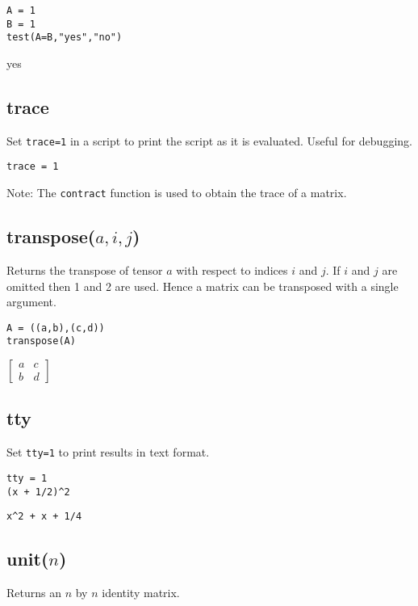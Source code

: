 {\color{blue}
\begin{verbatim}
A = 1
B = 1
test(A=B,"yes","no")
\end{verbatim}
}

\noindent
yes

\subsection*{trace}

Set {\tt trace=1} in a script to print the script as it is evaluated.
Useful for debugging.

{\color{blue}
\begin{verbatim}
trace = 1
\end{verbatim}
}

\noindent
Note:
The
\verb$contract$
function is used to obtain the trace of a matrix.

\subsection*{transpose($a,i,j$)}

Returns the transpose of tensor $a$ with respect to indices $i$ and $j$.
If $i$ and $j$ are omitted then 1 and 2 are used.
Hence a matrix can be transposed with a single argument.

{\color{blue}
\begin{verbatim}
A = ((a,b),(c,d))
transpose(A)
\end{verbatim}
}

\noindent
$\displaystyle
\begin{bmatrix}
a & c\\
b & d
\end{bmatrix}
$

\subsection*{tty}

Set {\tt tty=1} to print results in text format.

{\color{blue}
\begin{verbatim}
tty = 1
(x + 1/2)^2
\end{verbatim}
}

\noindent
\verb$x^2 + x + 1/4$

\subsection*{unit($n$)}

Returns an $n$ by $n$ identity matrix.

